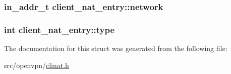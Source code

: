 \subsubsection[{network}]{\setlength{\rightskip}{0pt plus 5cm}in\+\_\+addr\+\_\+t client\+\_\+nat\+\_\+entry\+::network}\label{structclient__nat__entry_a4201fa6551314373401d386494ca451d}
\hypertarget{structclient__nat__entry_a1ef20d15d70fa68864a1fb9714616cd9}{}
\subsubsection[{type}]{\setlength{\rightskip}{0pt plus 5cm}int client\+\_\+nat\+\_\+entry\+::type}\label{structclient__nat__entry_a1ef20d15d70fa68864a1fb9714616cd9}


The documentation for this struct was generated from the following file\+:\begin{DoxyCompactItemize}
\item 
src/openvpn/\hyperlink{clinat_8h}{clinat.\+h}\end{DoxyCompactItemize}
